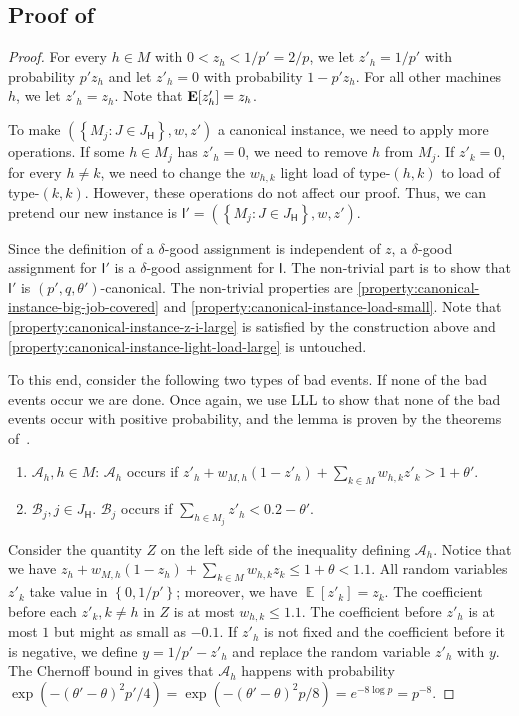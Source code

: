 \documentclass[11pt]{article}
\newcounter{prop}
\newcommand{\set}[1]{\left\{#1\right\}}
\DeclareMathOperator{\E}{\mathbb E}
\newcommand{\calA}{{\mathscr A}}
\newcommand{\calB}{{\mathscr B}}
\newcommand{\cI}{{\mathsf I}}
\newcommand{\sfH}{{\mathsf H}}
\newcommand{\Exp}{\EX}
\newcommand{\EX}{\hbox{\bf E}}
\begin{document}
\subsection{Proof of }
\label{app:reducing-p-and-q-2}
\reducep*
\begin{proof}
For every $h \in M$ with $ 0 < z_h < 1/p' = 2/p$, we let $z'_h = 1/p'$ with probability $p'z_h$ and let $z'_h = 0$ with probability $1-p'z_h$. For all other machines $h$, we let $z'_h = z_h$.  Note that $\Exp[z'_h] = z_h$. 

To make $(\set{M_j:J \in J_\sfH}, w, z')$ a canonical instance, we need to apply more operations. If some $h \in M_j$ has $z'_h = 0$, we need to remove $h$ from $M_j$. If $z'_k = 0$, for every $h \neq k$, we need to change the $w_{h,k}$ light load of type-$(h, k)$ to load of type-$(k, k)$.  However, these operations do not affect our proof. Thus, we can pretend our new instance is $\cI' = (\set{M_j:J \in J_\sfH}, w, z')$.

Since the definition of a $\delta$-good assignment is independent of $z$,  a $\delta$-good assignment for $\cI'$ is a $\delta$-good assignment for $\cI$. The non-trivial part is to show that $\cI'$ is $(p',q,\theta')$-canonical. The non-trivial properties are  \ref{property:canonical-instance-big-job-covered} and \ref{property:canonical-instance-load-small}. Note that \ref{property:canonical-instance-z-i-large} is satisfied by the construction above and \ref{property:canonical-instance-light-load-large} is untouched.

To this end, consider the following two types of bad events. If none of the bad events occur we are done. Once again, we use LLL to show that none of the bad events occur with positive probability, and the lemma is proven by the theorems of~\cite{MT10,HSS11}.
\begin{enumerate}
 \item ${\calA}_h, h \in M$: ${\calA}_h$ occurs if $z'_h+w_{M,h}(1-z'_h) + \sum_{k \in M}w_{h,k}z'_{k} > 1+\theta'$.
 
\item ${\calB}_j, j \in {J_\sfH}$. ${\calB}_j$ occurs if $\sum_{h\in M_j}z'_h < 0.2 - \theta'$.
\end{enumerate}

Consider the quantity $Z$ on the left side of the inequality defining ${\calA}_h$. Notice that we have $z_h+{w_{M,h}}(1-z_h) + \sum_{k \in M}w_{h,k}z_{k} \leq 1+\theta < 1.1$.  All random variables $z'_k$ take value in $\set{0, 1/p'}$; moreover, we have $\E[z'_k] = z_k$.   The coefficient before each $z'_k, k \neq h$ in $Z$ is at most $w_{h,k}\leq 1.1$. The coefficient before $z'_h$ is at most $1$ but might as small as $-0.1$. If $z'_h$ is not fixed and the coefficient before it is negative, we define $y = 1/p' - z'_h$ and replace the random variable $z'_h$ with $y$. The Chernoff bound in  gives that $\calA_h$ happens with probability
$\exp\left(-(\theta' - \theta)^2p'/4\right) = \exp\left(-(\theta' - \theta)^2p/8\right)=e^{-8\log p}=p^{-8}$.


\end{proof}
\end{document}
